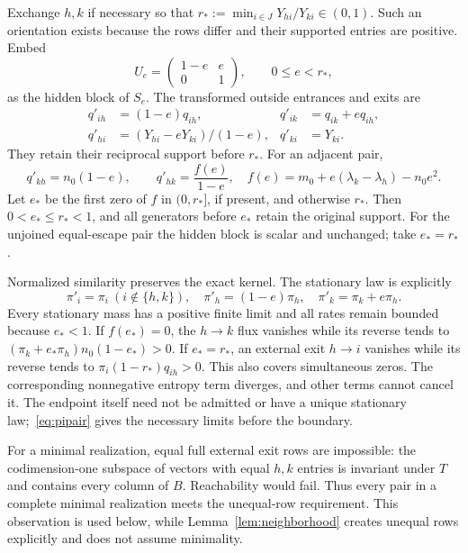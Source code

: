 Exchange $h,k$ if necessary so that $r_*:=\min_{i\in J}Y_{hi}/Y_{ki}\in(0,1)$. Such an orientation exists because the rows differ and their supported entries are positive. Embed
\begin{equation}
 U_e=\begin{pmatrix}1-e&e\\0&1\end{pmatrix},\qquad 0\le e<r_*,
\end{equation}
as the hidden block of $S_e$. The transformed outside entrances and exits are
\begin{align}
 q'_{ih}&=(1-e)q_{ih},&q'_{ik}&=q_{ik}+eq_{ih},\\
 q'_{hi}&=(Y_{hi}-eY_{ki})/(1-e),&q'_{ki}&=Y_{ki}.
\end{align}
They retain their reciprocal support before $r_*$. For an adjacent pair,
\begin{equation}
 q'_{kh}=n_0(1-e),\qquad
 q'_{hk}=\frac{f(e)}{1-e},\quad
 f(e)=m_0+e(\lambda_k-\lambda_h)-n_0e^2.\label{eq:shear}
\end{equation}
Let $e_*$ be the first zero of $f$ in $(0,r_*]$, if present, and otherwise $r_*$. Then $0<e_*\le r_*<1$, and all generators before $e_*$ retain the original support. For the unjoined equal-escape pair the hidden block is scalar and unchanged; take $e_*=r_*$.

Normalized similarity preserves the exact kernel. The stationary law is explicitly
\begin{equation}
 \pi'_i=\pi_i\ (i\notin\{h,k\}),\quad
 \pi'_h=(1-e)\pi_h,\quad\pi'_k=\pi_k+e\pi_h.\label{eq:pipair}
\end{equation}
Every stationary mass has a positive finite limit and all rates remain bounded because $e_*<1$. If $f(e_*)=0$, the $h\to k$ flux vanishes while its reverse tends to $(\pi_k+e_*\pi_h)n_0(1-e_*)>0$. If $e_*=r_*$, an external exit $h\to i$ vanishes while its reverse tends to $\pi_i(1-r_*)q_{ih}>0$. This also covers simultaneous zeros. The corresponding nonnegative entropy term diverges, and other terms cannot cancel it. The endpoint itself need not be admitted or have a unique stationary law;~\eqref{eq:pipair} gives the necessary limits before the boundary.

For a minimal realization, equal full external exit rows are impossible: the codimension-one subspace of vectors with equal $h,k$ entries is invariant under $T$ and contains every column of $B$. Reachability would fail. Thus every pair in a complete minimal realization meets the unequal-row requirement. This observation is used below, while Lemma~\ref{lem:neighborhood} creates unequal rows explicitly and does not assume minimality.

